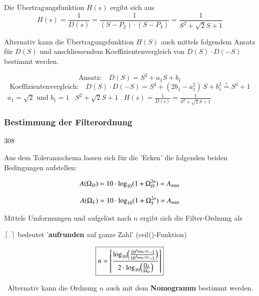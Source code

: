 \vspace{0.2cm}
Die Übertragungsfunktion $H(s)$ ergibt sich aus
$$ H(s) = \frac{1}{D(s)} = \frac{1}{(S - P_2) \cdot (S - P_3)} = \frac{1}{S^2 + \sqrt{2} S + 1} $$


Alternativ kann die Übertragungsfunktion $H(S)$ auch mittels folgendem Ansatz für $D(S)$ und anschliessendem Koeffizientenvergleich
von $D(S) \cdot D(-S)$ bestimmt werden.

$$ \text{Ansatz:} \quad  D(S) =  S^2 + a_1 S + b_1 $$
$$ \text{Koeffizientenvergleich:} \quad D(S) \cdot D(-S) = S^4 + (2 b_1 - a_1^2) \, S + b_1^2 \overset{!}{=} S^4 + 1 $$
\textrightarrow\ $a_1 = \sqrt{2}$ und $b_1 = 1$ \quad \textrightarrow\ $S^2 + \sqrt{2} S + 1$ 
\quad \textrightarrow\ $H(s) = \frac{1}{D(s)} = \frac{1}{S^2 + \sqrt{2} S + 1}$


\subsubsection{Bestimmung der Filterordnung}{308}

Aus dem Toleranzschema lassen sich für die 'Ecken' die folgenden beiden Bedingungen aufstellen:

\begin{minipage}[c]{0.48\columnwidth}
    $$ A(\Omega_D) = 10 \cdot \log_{10}(1 + \Omega_D^{2n}) = A_{\rm max} $$
\end{minipage}
\hfill
\begin{minipage}[c]{0.48\columnwidth}
    $$ A(\Omega_S) = 10 \cdot \log_{10}(1 + \Omega_S^{2n}) = A_{\rm min} $$
\end{minipage}

\vspace{0.2cm}
\begin{minipage}[c]{0.48\columnwidth}
    Mittels Umformungen und aufgelöst nach $n$ ergibt sich die Filter-Ordnung als 

    \medskip
    $\left\lceil . \right\rceil $ bedeutet '\textbf{aufrunden} auf ganze Zahl' (ceil()-Funktion)
\end{minipage}
\hfill
\begin{minipage}[c]{0.48\columnwidth}
    $$ \boxed{ n =  \left\lceil \frac{\log_{10} \Bigl( \frac{10^{A_{\rm min / 10}} - 1}{10^{A_{\rm max / 10}} - 1}  \Bigr) }
        {2 \cdot \log_{10}\Bigl( \frac{\Omega_S}{\Omega_D} \Bigr)}  \right\rceil } $$
\end{minipage}

\textrightarrow\ Alternativ kann die Ordnung $n$ auch mit dem \textbf{Nomogramm} bestimmt werden.

